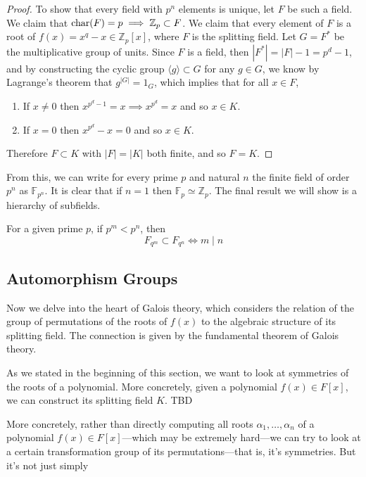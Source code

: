 \begin{proof}
    To show that every field with $p^n$ elements is unique, let $F$ be such a field. We claim that $\Char(F) = p \implies \mathbb{Z}_p \subset F$. We claim that every element of $F$ is a root of $f(x) = x^q - x \in \mathbb{Z}_p [x]$, where $F$ is the splitting field. Let $G = F^\ast$ be the multiplicative group of units. Since $F$ is a field, then $|F^\ast| = |F| - 1 = p^d - 1$, and by constructing the cyclic group $\langle g \rangle \subset G$ for any $g \in G$, we know by Lagrange's theorem that $g^{|G|} = 1_G$, which implies that for all $x \in F$, 
    \begin{enumerate}
      \item If $x \neq 0$ then $x^{p^d - 1} = x \implies x^{p^d} = x$ and so $x \in K$. 
      \item If $x = 0$ then $x^{p^d} - x = 0$ and so $x \in K$. 
    \end{enumerate}
    Therefore $F \subset K$ with $|F| = |K|$ both finite, and so $F = K$. 
  \end{proof} 

  From this, we can write for every prime $p$ and natural $n$ the finite field of order $p^n$ as $\mathbb{F}_{p^n}$. It is clear that if $n = 1$ then $\mathbb{F}_p \simeq \mathbb{Z}_p$. The final result we will show is a hierarchy of subfields. 

  \begin{theorem}
    For a given prime $p$, if $p^m < p^n$, then 
    \begin{equation}
      F_{q^m} \subset F_{q^n} \iff m \mid n
    \end{equation}
  \end{theorem}

\subsection{Automorphism Groups} 

  Now we delve into the heart of Galois theory, which considers the relation of the group of permutations of the roots of $f(x)$ to the algebraic structure of its splitting field. The connection is given by the fundamental theorem of Galois theory. 

  As we stated in the beginning of this section, we want to look at symmetries of the roots of a polynomial. More concretely, given a polynomial $f(x) \in F[x]$, we can construct its splitting field $K$. TBD

  More concretely, rather than directly computing all roots $\alpha_1, \ldots, \alpha_n$ of a polynomial $f(x) \in F[x]$---which may be extremely hard---we can try to look at a certain transformation group of its permutations---that is, it's symmetries. But it's not just simply 


